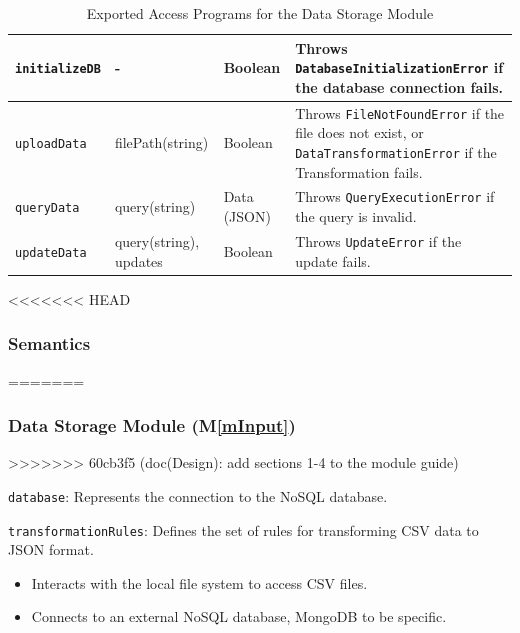 \documentclass[12pt, titlepage]{article}
\newcommand{\mref}[1]{M\ref{#1}}
\begin{document}
\begin{description}
\begin{description}
\begin{table}[h!]
\begin{tabular}{p{} p{} p{} p{}}
    \texttt{initializeDB} & - & Boolean & Throws \texttt{DatabaseInitializationError}
    if the database connection fails.\\
    \midrule
    
    \texttt{uploadData} & filePath(string) & Boolean & Throws \texttt{FileNotFoundError}
    if the file does not exist, or \texttt{DataTransformationError} if the Transformation
    fails.\\
    \midrule

    \texttt{queryData} & query(string) & Data (JSON) & Throws \texttt{QueryExecutionError}
    if the query is invalid.\\
    \midrule

    \texttt{updateData} & query(string), updates & Boolean & Throws \texttt{UpdateError}
    if the update fails.\\
    \bottomrule
    
    \end{tabular}
    \caption{Exported Access Programs for the Data Storage Module}
    \label{TblEAP_Storage}
  \end{table}
\end{description}

<<<<<<< HEAD
\subsubsection{Semantics}
=======
\subsubsection{Data Storage Module (\mref{mInput})}

>>>>>>> 60cb3f5 (doc(Design): add sections 1-4 to the module guide)
\begin{description}
  \item[State Variables:]
  \item
  \texttt{database}: Represents the connection to the NoSQL database.
  \item
  \texttt{transformationRules}: Defines the set of rules for transforming CSV data to
  JSON format.
  \item[Environment Variables:]
  \item
  \begin{itemize}
    \item Interacts with the local file system to access CSV files.
  \end{itemize}
  \item 
  \begin{itemize}
    \item Connects to an external NoSQL database, MongoDB to be specific.
  \end{itemize}
  \item 


\end{description}
\end{description}
\end{document}
